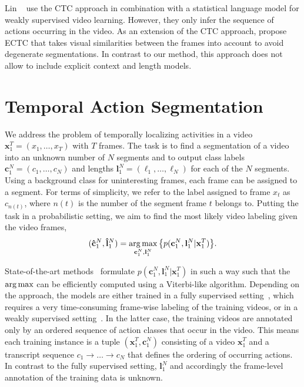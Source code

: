 \documentclass[10pt,twocolumn,letterpaper]{article}
\newcommand{\argmax}{\operatornamewithlimits{arg\,max}}
\begin{document}
Lin \etal~\cite{lin2017ctc} use the CTC approach in combination with a statistical language model
for weakly supervised video learning. However, they only infer the sequence of actions occurring in the video.
As an extension of the CTC approach, \cite{huang2016connectionist} propose ECTC
that takes visual similarities between the frames into account to avoid degenerate
segmentations. In contrast to our method, this approach does not allow to include explicit context
and length models.

\section{Temporal Action Segmentation}

We address the problem of temporally localizing activities in a video $\mathbf{x}_1^T = (x_1,\dots,x_T)$ with $ T $ frames.  
The task is to find a segmentation of a video  into an unknown number of $ N $ segments and to
output class labels $ \mathbf{c}_1^N = (c_1,\dots,c_N) $ and lengths $ \mathbf{l}_1^N = (\ell_1,\dots,\ell_N) $
for each of the $ N $ segments. Using a background class for uninteresting frames, each frame
can be assigned to a segment.
For terms of simplicity, we refer to the label assigned to frame $ x_t $ as $ c_{n(t)} $, where
$ n(t) $ is the number of the segment frame $ t $ belongs to.
Putting the task in a probabilistic setting, we aim to find the most likely video
labeling given the video frames, \ie
\begin{align}
    (\mathbf{\hat c}_1^N, \mathbf{\hat l}_1^N) = \argmax_{\mathbf{c}_1^N, \mathbf{l}_1^N} \big\{ p(\mathbf{c}_1^N, \mathbf{l}_1^N | \mathbf{x}_1^T) \big\}.
    \label{eq:generalModel}
\end{align}

State-of-the-art methods~\cite{vo2014stochastic,richard2016temporal,kuehne2017weakly,koller2016deephand,richard2017weakly,koller2017resign} formulate $p(\mathbf{c}_1^N, \mathbf{l}_1^N | \mathbf{x}_1^T)$ in such a way such that the $ \argmax $ can be efficiently computed using a Viterbi-like algorithm. Depending on the approach, the models are either trained in a fully supervised setting~\cite{vo2014stochastic,richard2016temporal}, which requires a very time-consuming frame-wise labeling of the training videos, or in a weakly supervised setting~\cite{kuehne2017weakly,koller2016deephand,richard2017weakly,koller2017resign}. In the latter case, the training videos are annotated only by an ordered sequence of action classes that occur in the video. This means each training instance is a tuple $ (\mathbf{x}_1^T, \mathbf{c}_1^N) $ consisting of a video $ \mathbf{x}_1^T $ and a transcript sequence $ c_1 \rightarrow \dots \rightarrow c_N $ that defines the ordering
of occurring actions. In contrast to the fully supervised setting, $\mathbf{l}_1^N$ and accordingly the frame-level annotation of the training data is unknown.
\end{document}
